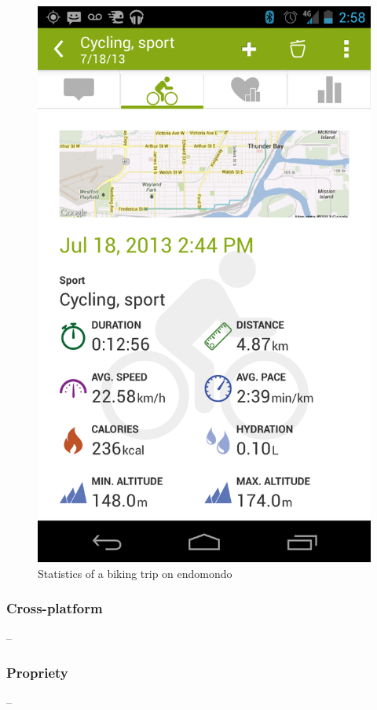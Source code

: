 \begin{figure}[h]
    \includegraphics[width=\textwidth]{Images/endomondo-bike-stats.png}
    \caption{Statistics of a biking trip on endomondo\cite{endomondo-bike-stats-img}}
\end{figure}

\subsubsection*{Cross-platform} -- 
\subsubsection*{Propriety} -- 
